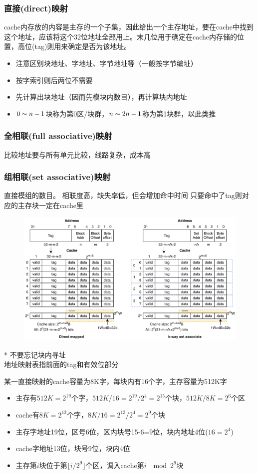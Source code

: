 \subsubsection{直接(direct)映射}
cache内存放的内容是主存的一个子集，因此给出一个主存地址，要在cache中找到这个地址，应该将这个32位地址全部用上。末几位用于确定在cache内存储的位置，高位(tag)则用来确定是否为该地址。
\begin{itemize}
	\item 注意区别块地址、字地址、字节地址等（一般按字节编址）
	\item 按字索引则后两位不需要
	\item 先计算出块地址（因而先模块内数目），再计算块内地址
	\item $0\thicksim n-1$块称为第0区/块群，$n\thicksim 2n-1$称为第1块群，以此类推
\end{itemize}

\subsubsection{全相联(full associative)映射}
比较地址要与所有单元比较，线路复杂，成本高

\subsubsection{组相联(set associative)映射}
直接模组的数目。
相联度高，缺失率低，但会增加命中时间
只要命中了tag则对应的主存块一定在cache里
\begin{figure}[H]
\centering
\includegraphics[width=0.8\linewidth]{fig/Cache-combine.pdf}
\end{figure}
* 不要忘记块内寻址\\
地址映射表指前面的tag和有效位部分

\begin{example}
某一直接映射的cache容量为8K字，每块内有16个字，主存容量为512K字
\end{example}
\begin{analysis}
\begin{itemize}
	\item 主存有$512K=2^{19}$个字，$512K/16=2^{19}/2^4=2^{15}$个块，$512K/8K=2^6$个区
	\item cache有$8K=2^{13}$个字，$8K/16=2^{13}/2^4=2^9$个块
	\item 主存字地址19位，区号6位，区内块号15-6=9位，块内地址4位($16=2^4$)
	\item cache字地址13位，块号9位，块内4位
	\item 主存第$i$块位于第$\lfloor i/2^9\rfloor$个区，调入cache第$i\;\mod 2^9$块
\end{itemize}
\end{analysis}


